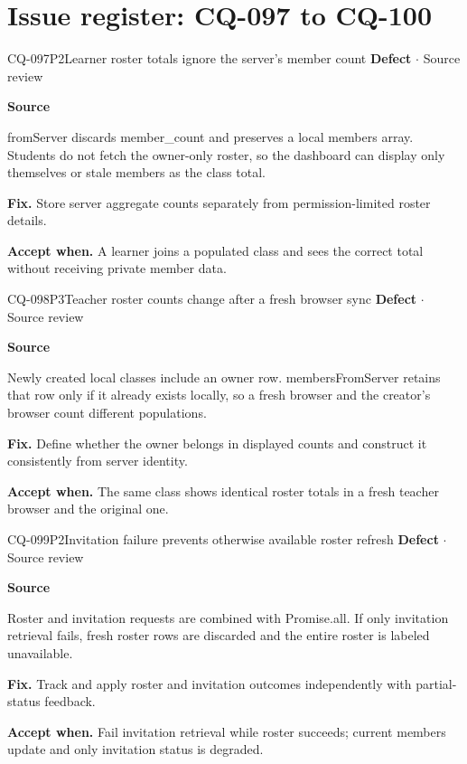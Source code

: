\section*{Issue register: CQ-097 to CQ-100}
\begin{finding}{CQ-097}{P2}{Learner roster totals ignore the server's member count}
\textbf{Defect} $\cdot$ Source review\par
\textbf{Source}\quad{}\par
fromServer discards member\_count and preserves a local members array. Students do not fetch the owner-only roster, so the dashboard can display only themselves or stale members as the class total.\par
\textbf{Fix.} Store server aggregate counts separately from permission-limited roster details.\par
\textbf{Accept when.} A learner joins a populated class and sees the correct total without receiving private member data.
\end{finding}
\begin{finding}{CQ-098}{P3}{Teacher roster counts change after a fresh browser sync}
\textbf{Defect} $\cdot$ Source review\par
\textbf{Source}\quad{}\par
Newly created local classes include an owner row. membersFromServer retains that row only if it already exists locally, so a fresh browser and the creator's browser count different populations.\par
\textbf{Fix.} Define whether the owner belongs in displayed counts and construct it consistently from server identity.\par
\textbf{Accept when.} The same class shows identical roster totals in a fresh teacher browser and the original one.
\end{finding}
\begin{finding}{CQ-099}{P2}{Invitation failure prevents otherwise available roster refresh}
\textbf{Defect} $\cdot$ Source review\par
\textbf{Source}\quad{}\par
Roster and invitation requests are combined with Promise.all. If only invitation retrieval fails, fresh roster rows are discarded and the entire roster is labeled unavailable.\par
\textbf{Fix.} Track and apply roster and invitation outcomes independently with partial-status feedback.\par
\textbf{Accept when.} Fail invitation retrieval while roster succeeds; current members update and only invitation status is degraded.
\end{finding}
